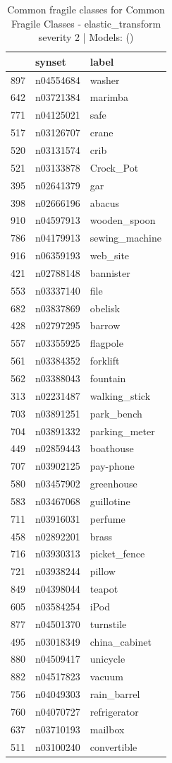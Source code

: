 \begin{table}
\caption{Common fragile classes for Common Fragile Classes - elastic_transform severity 2 | Models: ()}
\label{tab:Common Fragile Classes - elastic_transform severity 2_d41d8cd9}
\begin{tabular}{cll}
\toprule
 & synset & label \\
\midrule
897 & n04554684 & washer \\
642 & n03721384 & marimba \\
771 & n04125021 & safe \\
517 & n03126707 & crane \\
520 & n03131574 & crib \\
521 & n03133878 & Crock_Pot \\
395 & n02641379 & gar \\
398 & n02666196 & abacus \\
910 & n04597913 & wooden_spoon \\
786 & n04179913 & sewing_machine \\
916 & n06359193 & web_site \\
421 & n02788148 & bannister \\
553 & n03337140 & file \\
682 & n03837869 & obelisk \\
428 & n02797295 & barrow \\
557 & n03355925 & flagpole \\
561 & n03384352 & forklift \\
562 & n03388043 & fountain \\
313 & n02231487 & walking_stick \\
703 & n03891251 & park_bench \\
704 & n03891332 & parking_meter \\
449 & n02859443 & boathouse \\
707 & n03902125 & pay-phone \\
580 & n03457902 & greenhouse \\
583 & n03467068 & guillotine \\
711 & n03916031 & perfume \\
458 & n02892201 & brass \\
716 & n03930313 & picket_fence \\
721 & n03938244 & pillow \\
849 & n04398044 & teapot \\
605 & n03584254 & iPod \\
877 & n04501370 & turnstile \\
495 & n03018349 & china_cabinet \\
880 & n04509417 & unicycle \\
882 & n04517823 & vacuum \\
756 & n04049303 & rain_barrel \\
760 & n04070727 & refrigerator \\
637 & n03710193 & mailbox \\
511 & n03100240 & convertible \\
\bottomrule
\end{tabular}
\end{table}
